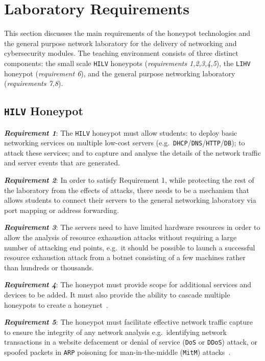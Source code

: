 \documentclass{ieeeaccess}
\begin{document}
\section{Laboratory Requirements}\label{sec:TeachingRequire}

This section discusses the main requirements of the honeypot technologies and
the general purpose network laboratory for the delivery of networking and
cybersecurity modules. The teaching environment consists of three distinct
components: the small scale \texttt{HILV} honeypots (\textit{requirements
1,2,3,4,5}), the \texttt{LIHV} honeypot (\textit{requirement 6}), and the
general purpose networking laboratory (\textit{requirements 7,8}).

\subsection{\texttt{HILV} Honeypot}\label{subsec:ResearchHoneypot}

\noindent\textit{\textbf{Requirement 1}}:
The \texttt{HILV} honeypot must allow students: to deploy basic networking services
on multiple low-cost servers
(e.g.\ \texttt{DHCP}/\texttt{DNS}/\texttt{HTTP}/\texttt{DB}); to attack these
services; and to capture and analyse the details of the network traffic
and server events that are generated.

\noindent\textit{\textbf{Requirement 2}}:
In order to satisfy Requirement 1, while protecting the rest of the laboratory
from the effects of attacks, there needs to be a mechanism that allows students
to connect their servers to the general networking laboratory via port mapping
or address forwarding.

\noindent\textit{\textbf{Requirement 3}}:
The servers need to have limited hardware resources in order to allow the
analysis of resource exhaustion attacks without requiring a large number of
attacking end points, e.g.\ it should be possible to launch a successful
resource exhaustion attack from a botnet consisting of a few machines rather
than hundreds or thousands.

\noindent\textit{\textbf{Requirement 4}}:
The honeypot must provide scope for additional services and devices to be
added. It must also provide the ability to cascade multiple honeypots to create
a honeynet~\cite{AA:15,FDF:15,KNC:15}.

\noindent\textit{\textbf{Requirement 5}}:
The honeypot must facilitate effective network traffic capture to ensure the
integrity of any network analysis e.g.\ identifying network transactions in a
website defacement or denial of service (\texttt{DoS} or \texttt{DDoS})
attack, or spoofed packets in \texttt{ARP} poisoning for
man-in-the-middle (\texttt{MitM}) attacks~\cite{PS:16,RSKA:16}.
\end{document}
